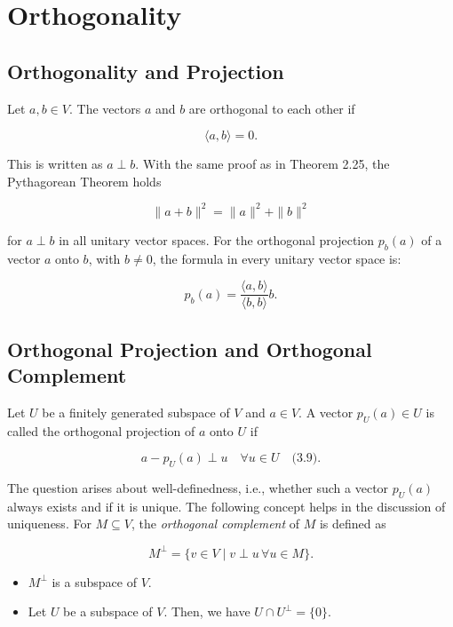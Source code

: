 \newpage
\section{Orthogonality}

\subsection{Orthogonality and Projection}

Let \( a, b \in V \). The vectors \( a \) and \( b \) are orthogonal to each other if

\[
\langle a, b \rangle = 0.
\]

This is written as \( a \perp b \).
\newline
With the same proof as in Theorem 2.25, the Pythagorean Theorem holds

\[
\|a + b\|^2 = \|a\|^2 + \|b\|^2
\]

for \( a \perp b \) in all unitary vector spaces.
\newline
For the orthogonal projection \( p_b(a) \) of a vector \( a \) onto \( b \), with \( b \neq 0 \), the formula in every unitary vector space is:

\[
p_b(a) = \frac{\langle a, b \rangle}{\langle b, b \rangle} b.
\]

\subsection{Orthogonal Projection and Orthogonal Complement}

Let \( U \) be a finitely generated subspace of \( V \) and \( a \in V \). A vector \( p_U(a) \in U \) is called the orthogonal projection of \( a \) onto \( U \) if

\[
a - p_U(a) \perp u \quad \forall u \in U \quad \text{(3.9)}.
\]

The question arises about well-definedness, i.e., whether such a vector \( p_U(a) \) always exists and if it is unique. The following concept helps in the discussion of uniqueness.
\newline
For \( M \subseteq V \), the \emph{orthogonal complement} of \( M \) is defined as

\[
M^\perp = \{ v \in V \mid v \perp u \, \forall u \in M \}.
\]

\begin{itemize}[label=\(-\)]
    \item \( M^\perp \) is a subspace of \( V \).
    \item Let \( U \) be a subspace of \( V \). Then, we have \( U \cap U^\perp = \{0\} \).
\end{itemize}

